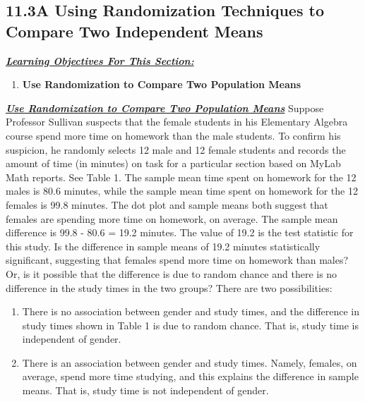 \documentclass{report}
\begin{document}
    \pagebreak \bigbreak \noindent 
    \subsection*{11.3A Using Randomization Techniques to Compare Two Independent Means}
    \bigbreak \noindent 
    \bigbreak \noindent 
    \textbf{\textit{\underline{Learning Objectives For This Section:}}}
    \begin{enumerate}
        \item \textbf{Use Randomization to Compare Two Population Means}
    \end{enumerate}
    \bigbreak \noindent \bigbreak \noindent 
    \textbf{\textit{\underline{ Use Randomization to Compare Two Population Means}}}
    \bigbreak \noindent 
    Suppose Professor Sullivan suspects that the female students in his Elementary Algebra course spend more time on homework than the male students. To confirm his suspicion, he randomly selects 12 male and 12 female students and records the amount of time (in minutes) on task for a particular section based on MyLab Math reports. See Table 1.
    \bigbreak \noindent 
    The sample mean time spent on homework for the 12 males is 80.6 minutes, while the sample mean time spent on homework for the 12 females is 99.8 minutes. The dot plot and sample means both suggest that females are spending more time on homework, on average. The sample mean difference is 99.8 - 80.6 = 19.2 minutes. The value of 19.2 is the test statistic for this study. 
    \bigbreak \noindent 
    Is the difference in sample means of 19.2 minutes statistically significant, suggesting that females spend more time on homework than males? Or, is it possible that the difference is due to random chance and there is no difference in the study times in the two groups? There are two possibilities:
    \begin{enumerate}
        \item There is no association between gender and study times, and the difference in study times shown in Table 1 is due to random chance. That is, study time is independent of gender.
        \item There is an association between gender and study times. Namely, females, on average, spend more time studying, and this explains the difference in sample means. That is, study time is not independent of gender.
    \end{enumerate}
\end{document}
